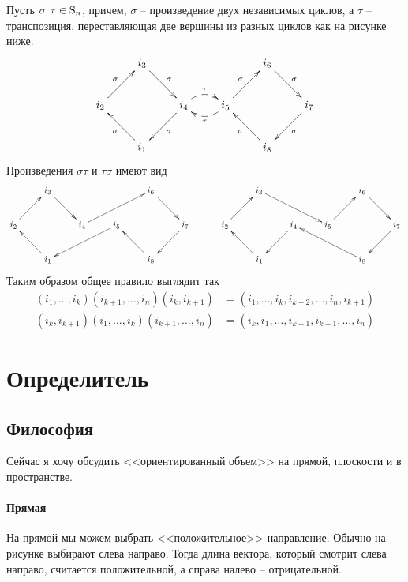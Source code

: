 Пусть $\sigma,\tau\in\operatorname{S}_{n}$, причем, $\sigma$ -- произведение двух независимых циклов, а $\tau$ -- транспозиция, переставляющая две вершины из разных циклов как на рисунке ниже.
\[
\xymatrix{
{}&{i_3}\ar[dr]^{\sigma}&{}&{}&{i_6}\ar[dr]^{\sigma}&{}\\
{i_2}\ar[ur]^{\sigma}&{}&{i_4}\ar[dl]^{\sigma}\ar@{-->}@/^10pt/[r]^{\tau}&{i_5}\ar[ur]^{\sigma}\ar@{-->}@/^10pt/[l]^{\tau}&{}&{i_7}\ar[dl]^{\sigma}\\
{}&{i_1}\ar[ul]^{\sigma}&{}&{}&{i_8}\ar[ul]^{\sigma}&{}\\
}
\]
Произведения $\sigma\tau$ и $\tau\sigma$ имеют вид
\[
\xymatrix{
	{}&{i_3}\ar[dr]&{}&{}&{i_6}\ar[dr]&{}\\
	{i_2}\ar[ur]&{}&{i_4}\ar[urr]&{i_5}\ar[dll]&{}&{i_7}\ar[dl]\\
	{}&{i_1}\ar[ul]&{}&{}&{i_8}\ar[ul]&{}\\
}
\quad\quad\quad
\xymatrix{
	{}&{i_3}\ar[drr]&{}&{}&{i_6}\ar[dr]&{}\\
	{i_2}\ar[ur]&{}&{i_4}\ar[dl]&{i_5}\ar[ur]&{}&{i_7}\ar[dl]\\
	{}&{i_1}\ar[ul]&{}&{}&{i_8}\ar[ull]&{}\\
}
\]
Таким образом общее правило выглядит так
\begin{align*}
(i_1,\ldots,i_k)(i_{k+1},\ldots,i_n)(i_k,i_{k+1}) &=(i_1,\ldots,i_k,i_{k+2},\ldots,i_n,i_{k+1})\\
(i_k,i_{k+1})(i_1,\ldots,i_k)(i_{k+1},\ldots,i_n) &= (i_k,i_1,\ldots,i_{k-1},i_{k+1},\ldots,i_n)
\end{align*}

\newpage

\section{Определитель}

\subsection{Философия}

Сейчас я хочу обсудить <<ориентированный объем>> на прямой, плоскости и в пространстве.

\paragraph{Прямая}

 На прямой мы можем выбрать <<положительное>> направление.
 Обычно на рисунке выбирают слева направо.
 Тогда длина вектора, который смотрит слева направо, считается положительной, а справа налево -- отрицательной.

